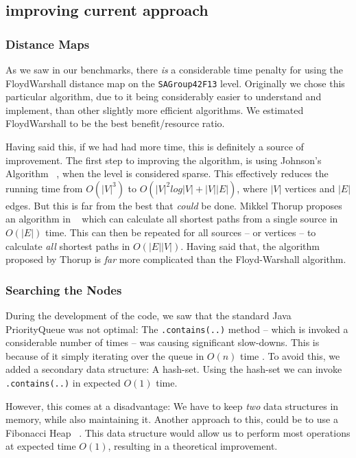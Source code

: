 \documentclass[letterpaper]{article}
\begin{document}
	\subsection{improving current approach} 

	\subsubsection{Distance Maps}
		As we saw in our benchmarks, there \emph{is} a considerable time penalty for using the FloydWarshall distance map on the \verb=SAGroup42F13= level. Originally we chose this particular algorithm, due to it being considerably easier to understand and implement, than other slightly more efficient algorithms. We estimated FloydWarshall to be the best benefit/resource ratio.

		Having said this, if we had had more time, this is definitely a source of improvement. The first step to improving the algorithm, is using Johnson's Algorithm ~\cite{jonhson}, when the level is considered sparse. This effectively reduces the running time from $O(|V|^3)$ to $O(|V|^2log|V|+|V||E|)$, where $|V|$ vertices and $|E|$ edges. But this is far from the best that \emph{could} be done. Mikkel Thorup proposes an algorithm in ~\cite{thorup} which can calculate all shortest paths from a single source in $O(|E|)$ time. This can then be repeated for all sources -- or vertices -- to calculate \emph{all} shortest paths in $O(|E||V|)$. Having said that, the algorithm proposed by Thorup is \emph{far} more complicated than the Floyd-Warshall algorithm.


	\subsubsection{Searching the Nodes}
		During the development of the code, we saw that the standard Java PriorityQueue was not optimal: The \verb=.contains(..)= method -- which is invoked a considerable number of times -- was causing significant slow-downs. This is because of it simply iterating over the queue in $O(n)$ time \cite{website:Java-Docs}. To avoid this, we added a secondary data structure: A hash-set. Using the hash-set we can invoke \verb=.contains(..)= in expected $O(1)$ time.

		However, this comes at a disadvantage: We have to keep \emph{two} data structures in memory, while also maintaining it. Another approach to this, could be to use a Fibonacci Heap ~\cite{fibonacci}. This data structure would allow us to perform most operations at expected time $O(1)$, resulting in a theoretical improvement.
\end{document}
